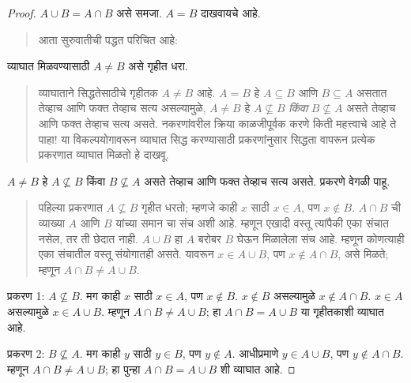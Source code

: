 \documentclass[../../../include/open-logic-section]{subfiles}
\begin{document}
\begin{proof}
$A \cup B = A \cap B$ असे समजा. $A = B$ दाखवायचे आहे.
\begin{quote}
आता सुरुवातीची पद्धत परिचित आहे:
\end{quote}
व्याघात मिळवण्यासाठी $A \neq B$ असे गृहीत धरा.
\begin{quote}
व्याघाताने सिद्धतेसाठीचे गृहीतक $A \neq B$ आहे. $A = B$ हे $A \subseteq B$ आणि $B \subseteq A$ असतात तेव्हाच आणि फक्त तेव्हाच सत्य असल्यामुळे, $A \neq B$ हे $A \nsubseteq B$ \emph{किंवा} $B \nsubseteq A$ असते तेव्हाच आणि फक्त तेव्हाच सत्य असते. नकरणांवरील क्रिया काळजीपूर्वक करणे किती महत्त्वाचे आहे ते पाहा!{} या विकल्पयोगावरून व्याघात सिद्ध करण्यासाठी प्रकरणांनुसार सिद्धता वापरून प्रत्येक प्रकरणात व्याघात मिळतो हे दाखवू.
\end{quote}
$A \neq B$ हे $A \nsubseteq B$ किंवा $B \nsubseteq A$ असते तेव्हाच आणि फक्त तेव्हाच सत्य असते. प्रकरणे वेगळी पाहू.
\begin{quote}
पहिल्या प्रकरणात $A \nsubseteq B$ गृहीत धरतो; म्हणजे काही $x$ साठी $x \in A$, पण $x \notin B$. $A \cap B$ ची व्याख्या $A$ आणि $B$ यांच्या समान चा संच अशी आहे. म्हणून एखादी वस्तू त्यांपैकी एका संचात नसेल, तर ती छेदात नाही. $A \cup B$ हा $A$ बरोबर $B$ घेऊन मिळालेला संच आहे. म्हणून कोणत्याही एका संचातील वस्तू संयोगातही असते. यावरून $x \in A \cup B$, पण $x \notin A \cap B$, असे मिळते; म्हणून $A \cap B \neq A \cup B$.
\end{quote}

प्रकरण 1: $A \nsubseteq B$. मग काही $x$ साठी $x \in A$, पण $x \notin B$. $x \notin B$ असल्यामुळे $x \notin A \cap B$. $x \in A$ असल्यामुळे $x \in A \cup B$. म्हणून $A \cap B \neq A \cup B$; हा $A \cap B = A \cup B$ या गृहीतकाशी व्याघात आहे.

प्रकरण 2: $B \nsubseteq A$. मग काही $y$ साठी $y \in B$, पण $y \notin A$. आधीप्रमाणे $y \in A \cup B$, पण $y \notin A \cap B$. म्हणून $A \cap B \neq A \cup B$; हा पुन्हा $A \cap B = A \cup B$ शी व्याघात आहे.
\end{proof}
\end{document}
